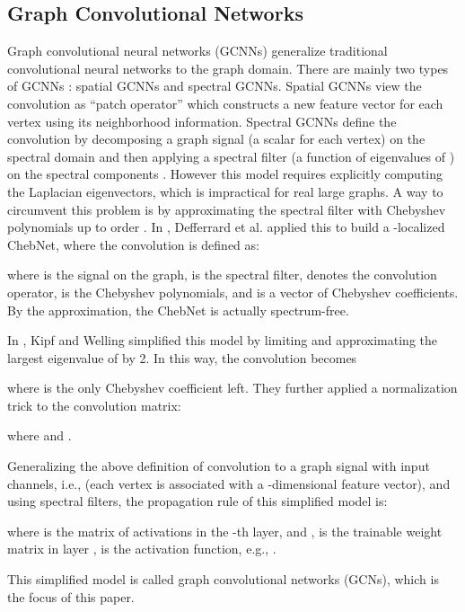 \documentclass[letterpaper]{article} \usepackage{aaai18}  \usepackage{times}  \usepackage{helvet}  \usepackage{courier}  \usepackage{url}  \usepackage{graphicx}  \usepackage{algorithm}
\begin{document}
\subsection{Graph Convolutional Networks}

Graph convolutional neural networks (GCNNs) generalize traditional convolutional neural networks to the graph domain. There are mainly two types of GCNNs \cite{bronstein2017geometric}: spatial GCNNs and spectral GCNNs. Spatial GCNNs view the convolution as ``patch operator'' which constructs a new feature vector for each vertex using its neighborhood information. Spectral GCNNs define the convolution by decomposing a graph signal  (a scalar for each vertex) on the spectral domain and then applying a spectral filter  (a function of eigenvalues of ) on the spectral components \cite{bruna2013spectral,sandryhaila2013discrete,shuman2013emerging}. However this model requires explicitly computing the Laplacian eigenvectors, which is impractical for real large graphs. A way to circumvent this problem is by approximating the spectral filter  with Chebyshev polynomials up to  order \cite{hammond2011wavelets}. In \cite{defferrard2016convolutional}, Defferrard et al. applied this to build a -localized ChebNet, where the convolution is defined as:

where  is the signal on the graph,  is the spectral filter,  denotes the convolution operator,  is the Chebyshev polynomials, and  is a vector of Chebyshev coefficients. By the approximation, the ChebNet is actually spectrum-free.




In \cite{kipf2016semi}, Kipf and Welling simplified this model by limiting  and approximating the largest eigenvalue  of  by 2. In this way, the convolution becomes

where  is the only Chebyshev coefficient left. They further applied a normalization trick to the convolution matrix:

where  and .

Generalizing the above definition of convolution to a graph signal with  input channels, i.e.,  (each vertex is associated with a -dimensional feature vector), and using  spectral filters, the propagation rule of this simplified model is:

where  is the matrix of activations in the -th layer, and ,  is the trainable weight matrix in layer ,  is the activation function, e.g., .

This simplified model is called graph convolutional networks (GCNs), which is the focus of this paper.
\end{document}
